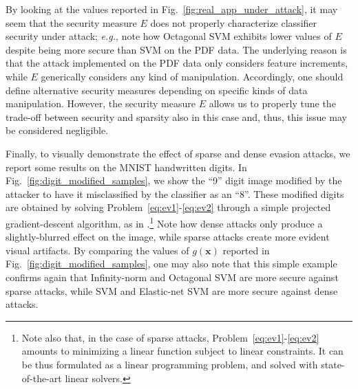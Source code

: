 \documentclass[runningheads,a4paper]{llncs}
\newcommand{\eg}{\emph{e.g.}}
\newcommand{\vct}[1]{\ensuremath{\boldsymbol{#1}}}
\begin{document}
By looking at the values reported in Fig.~\ref{fig:real_app_under_attack}, it may seem that the security measure $E$ does not properly characterize classifier security under attack; \eg, note how Octagonal SVM exhibits lower values of $E$ despite being more secure than SVM on the PDF data.
The underlying reason is that the attack implemented on the PDF data only considers feature increments, while $E$ generically considers any kind of manipulation. Accordingly, one should define alternative security measures depending on specific kinds of data manipulation.
However, the security measure $E$ allows us to properly tune the trade-off between security and sparsity also in this case and, thus, this issue may be considered negligible.

Finally, to visually demonstrate the effect of sparse and dense evasion attacks, we report some results on the MNIST handwritten digits. In Fig.~\ref{fig:digit_modified_samples}, we show the ``9'' digit image modified by the attacker to have it misclassified by the classifier as an ``8''.
These modified digits are obtained by solving Problem~\eqref{eq:ev1}-\eqref{eq:ev2} through a simple projected gradient-descent algorithm, as in \cite{biggio13-ecml}.\footnote{Note also that, in the case of sparse attacks, Problem~\eqref{eq:ev1}-\eqref{eq:ev2} amounts to minimizing a linear function subject to linear constraints. It can be thus formulated as a linear programming problem, and solved with state-of-the-art linear solvers.}
Note how dense attacks only produce a slightly-blurred effect on the image, while sparse attacks create more evident visual artifacts. 
By comparing the values of $g(\vct x)$ reported in Fig.~\ref{fig:digit_modified_samples}, one may also note that this simple example confirms again that Infinity-norm and Octagonal SVM are more secure against sparse attacks, while SVM and Elastic-net SVM are more secure against dense attacks.
\end{document}
